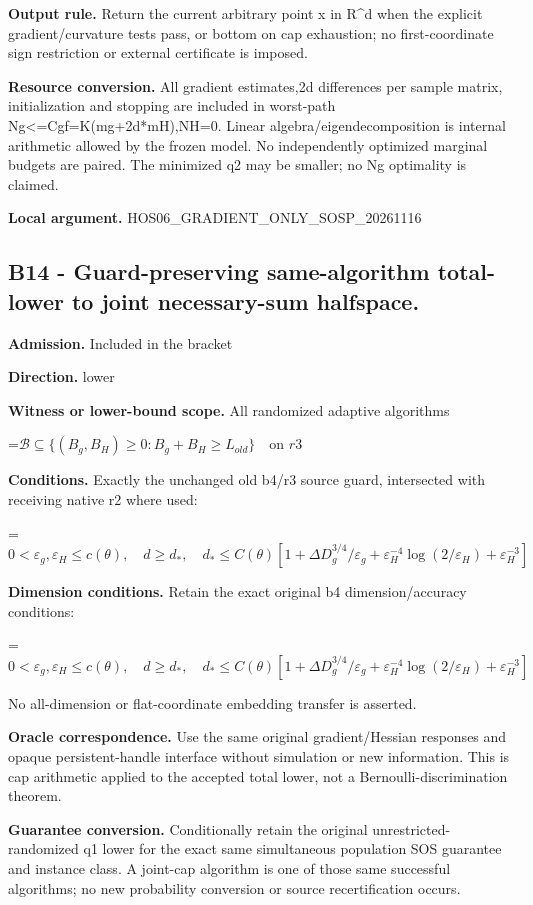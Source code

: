 \documentclass[10pt,a4paper]{article}
\newcommand{\AtlasMath}[1]{\par\begingroup\centering\setbox0=\hbox{$\displaystyle #1$}\ifdim\wd0>1.4\linewidth\typeout{ATLAS WIDE FORMULA: \the\wd0}\fi\ifdim\wd0>\linewidth\resizebox{\linewidth}{!}{\box0}\else\box0\fi\par\endgroup}
\begin{document}
\textbf{Output rule.} Return the current arbitrary point x in R\textasciicircum{}d when the explicit gradient/curvature tests pass, or bottom on cap exhaustion; no first-coordinate sign restriction or external certificate is imposed.

\textbf{Resource conversion.} All gradient estimates,2d differences per sample matrix, initialization and stopping are included in worst-path Ng<=Cgf=K(mg+2d*mH),NH=0. Linear algebra/eigendecomposition is internal arithmetic allowed by the frozen model. No independently optimized marginal budgets are paired. The minimized q2 may be smaller; no Ng optimality is claimed.

\textbf{Local argument.} HOS06\_\allowbreak{}GRADIENT\_\allowbreak{}ONLY\_\allowbreak{}SOSP\_\allowbreak{}20261116

\subsection{B14 - Guard-preserving same-algorithm total-lower to joint necessary-sum halfspace.}
\textbf{Admission.} Included in the bracket

\textbf{Direction.} lower

\textbf{Witness or lower-bound scope.} All randomized adaptive algorithms

\AtlasMath{\mathcal B\subseteq\{(B_g,B_H)\ge0:B_g+B_H\ge L_{old}\}\quad\text{on }r3}
\textbf{Conditions.} Exactly the unchanged old b4/r3 source guard, intersected with receiving native r2 where used: 
\AtlasMath{0<\varepsilon_g,\varepsilon_H\le c(\theta),\quad d\ge d_*,\quad d_*\le C(\theta)[1+\Delta D_g^{3/4}/\varepsilon_g+\varepsilon_H^{-4}\log(2/\varepsilon_H)+\varepsilon_H^{-3}]}


\textbf{Dimension conditions.} Retain the exact original b4 dimension/accuracy conditions: 
\AtlasMath{0<\varepsilon_g,\varepsilon_H\le c(\theta),\quad d\ge d_*,\quad d_*\le C(\theta)[1+\Delta D_g^{3/4}/\varepsilon_g+\varepsilon_H^{-4}\log(2/\varepsilon_H)+\varepsilon_H^{-3}]}
 No all-dimension or flat-coordinate embedding transfer is asserted.

\textbf{Oracle correspondence.} Use the same original gradient/Hessian responses and opaque persistent-handle interface without simulation or new information. This is cap arithmetic applied to the accepted total lower, not a Bernoulli-discrimination theorem.

\textbf{Guarantee conversion.} Conditionally retain the original unrestricted-randomized q1 lower for the exact same simultaneous population SOS guarantee and instance class. A joint-cap algorithm is one of those same successful algorithms; no new probability conversion or source recertification occurs.
\end{document}
